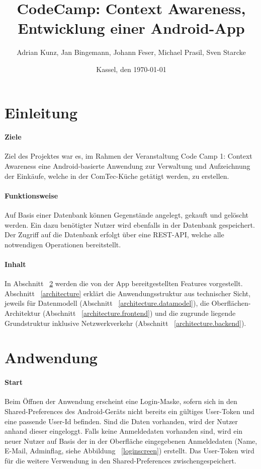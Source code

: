 \documentclass{scrartcl}
\begin{document}
	\title{CodeCamp: Context Awareness, Entwicklung einer Android-App}
	\author{Adrian Kunz, Jan Bingemann, Johann Feser, Michael Prasil, Sven Starcke}
	\date{Kassel, den \today}
	
	\maketitle
	\vspace*{10ex}
	\tableofcontents
	
	\newpage
	
	\section{Einleitung}
		\paragraph*{Ziele}
		Ziel des Projektes war es, im Rahmen der Veranstaltung \glqq Code Camp 1: Context Awareness\grqq{} eine Android-basierte Anwendung zur Verwaltung und Aufzeichnung der Einkäufe, welche in der ComTec-Küche getätigt werden, zu erstellen.
		
		\paragraph*{Funktionsweise}
		Auf Basis einer Datenbank können Gegenstände angelegt, gekauft und gelöscht werden. Ein dazu benötigter Nutzer wird ebenfalls in der Datenbank gespeichert. Der Zugriff auf die Datenbank erfolgt über eine REST-API, welche alle notwendigen Operationen bereitstellt.
		
		\paragraph*{Inhalt}
		In Abschnitt ~\ref{features} werden die von der App bereitgestellten Features vorgestellt. Abschnitt ~\ref{architecture} erklärt die Anwendungsstruktur aus technischer Sicht, jeweils für Datenmodell (Abschnitt ~\ref{architecture.datamodel}), die Oberflächen-Architektur (Abschnitt ~\ref{architecture.frontend}) und die zugrunde liegende Grundstruktur inklusive Netzwerkverkehr (Abschnitt ~\ref{architecture.backend}).
		
	\section{Andwendung} \label{features}
		\paragraph*{Start}
		Beim Öffnen der Anwendung erscheint eine Login-Maske, sofern sich in den Shared-Preferences des Android-Geräts nicht bereits ein gültiges User-Token und eine passende User-Id befinden. Sind die Daten vorhanden, wird der Nutzer anhand dieser eingeloggt. Falls keine Anmeldedaten vorhanden sind, wird ein neuer Nutzer auf Basis der in der Oberfläche eingegebenen Anmeldedaten (Name, E-Mail, Adminflag, siehe Abbildung ~\ref{loginscreen}) erstellt. Das User-Token wird für die weitere Verwendung in den Shared-Preferences zwischengespeichert.
	
\end{document}
